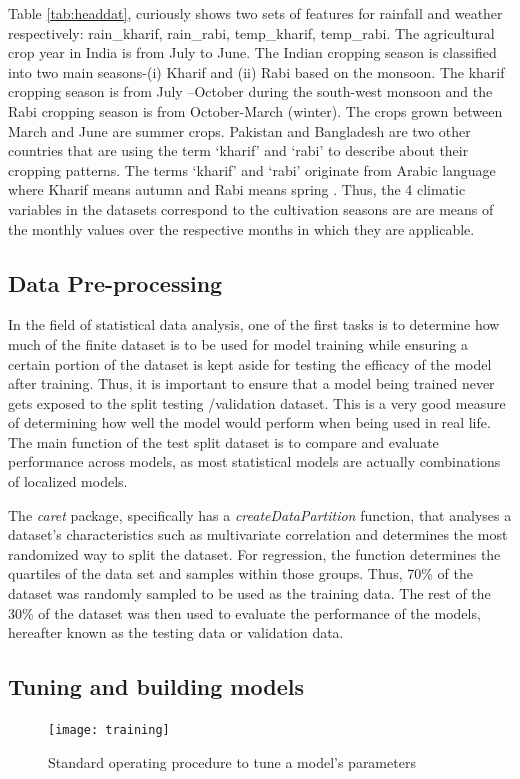 \documentclass[conference]{IEEEtran}
\begin{document}
Table \ref{tab:headdat}, curiously shows two sets of features for rainfall and weather respectively: rain\_kharif, rain\_rabi, temp\_kharif, temp\_rabi. The agricultural crop year in India is from July to June. The Indian cropping season is classified into two main seasons-(i) Kharif and (ii) Rabi based on the monsoon. The kharif cropping season is from July –October during the south-west monsoon and the Rabi cropping season is from October-March (winter). The crops grown between March and June are summer crops. Pakistan and Bangladesh are two other countries that are using the term ‘kharif’ and ‘rabi’ to describe about their cropping patterns. The terms ‘kharif’ and ‘rabi’ originate from Arabic language where Kharif means autumn and Rabi means spring \cite{Cropp54:online}. Thus, the 4 climatic variables in the datasets correspond to the cultivation seasons are are means of the monthly values over the respective months in which they are applicable.

\subsection{Data Pre-processing}
In the field of statistical data analysis, one of the first tasks is to determine how much of the finite dataset is to be used for model training while ensuring a certain portion of the dataset is kept aside for testing the efficacy of the model after training. Thus, it is important to ensure that a model being trained never gets exposed to the split testing /validation dataset. This is a very good measure of determining how well the model would perform when being used in real life. The main function of the test split dataset is to compare and evaluate performance across models, as most statistical models are actually combinations of localized models.

The \textit{caret} package, specifically has a \textit{createDataPartition} function, that analyses a dataset's characteristics such as multivariate correlation and determines the most randomized way to split the dataset. For regression, the function determines the quartiles of the data set and samples within those groups. Thus, 70\% of the dataset was randomly sampled to be used as the training data. The rest of the 30\% of the dataset was then used to evaluate the performance of the models, hereafter known as the testing data or validation data. 
\subsection{Tuning and building models}
\begin{figure}[!h]
\centering
\texttt{[image: training]}
\caption{Standard operating procedure to tune a model's parameters \cite{Model99:online}}
\label{training}
\end{figure}
\end{document}
